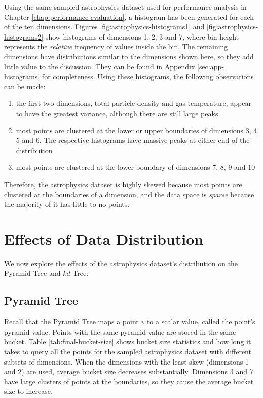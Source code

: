 Using the same sampled astrophysics dataset used for performance analysis in Chapter \ref{chap:performance-evaluation}, a histogram has been generated for each of the ten dimensions. Figures \ref{fig:astrophysics-histograms1} and \ref{fig:astrophysics-histograms2} show histograms of dimensions 1, 2, 3 and 7, where bin height represents the \textit{relative} frequency of values inside the bin. The remaining dimensions have distributions similar to the dimensions shown here, so they add little value to the discussion. They can be found in Appendix \ref{sec:app-histograms} for completeness. Using these histograms, the following observations can be made:
\begin{enumerate}
	\item the first two dimensions, total particle density and gas temperature, appear to have the greatest variance, although there are still large peaks
	\item most points are clustered at the lower or upper boundaries of dimensions 3, 4, 5 and 6. The respective histograms have massive peaks at either end of the distribution
	\item most points are clustered at the lower boundary of dimensions 7, 8, 9 and 10
\end{enumerate}
Therefore, the astrophysics dataset is highly skewed because most points are clustered at the boundaries of a dimension, and the data space is \textit{sparse} because the majority of it has little to no points.

\section{Effects of Data Distribution}

We now explore the effects of the astrophysics dataset's distribution on the Pyramid Tree and $kd$-Tree.

\subsection{Pyramid Tree}

Recall that the Pyramid Tree maps a point $v$ to a scalar value, called the point's pyramid value. Points with the same pyramid value are stored in the same bucket. Table \ref{tab:final-bucket-size} shows bucket size statistics and how long it takes to query all the points for the sampled astrophysics dataset with different subsets of dimensions. When the dimensions with the least skew (dimensions 1 and 2) are used, average bucket size decreases substantially. Dimensions 3 and 7 have large clusters of points at the boundaries, so they cause the average bucket size to increase.

